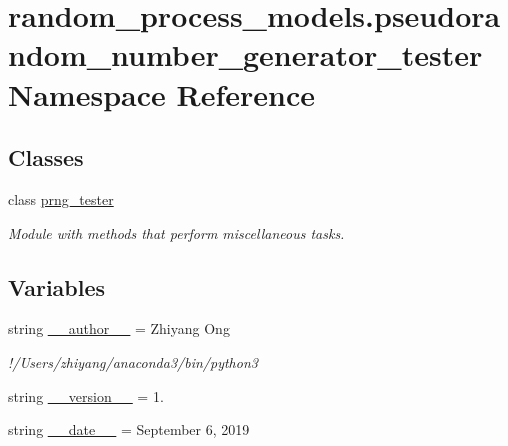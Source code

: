 \hypertarget{namespacerandom__process__models_1_1pseudorandom__number__generator__tester}{}\section{random\+\_\+process\+\_\+models.\+pseudorandom\+\_\+number\+\_\+generator\+\_\+tester Namespace Reference}
\label{namespacerandom__process__models_1_1pseudorandom__number__generator__tester}
\subsection*{Classes}
\begin{DoxyCompactItemize}
\item 
class \hyperlink{classrandom__process__models_1_1pseudorandom__number__generator__tester_1_1prng__tester}{prng\+\_\+tester}
\begin{DoxyCompactList}\small\item\em Module with methods that perform miscellaneous tasks. \end{DoxyCompactList}\end{DoxyCompactItemize}
\subsection*{Variables}
\begin{DoxyCompactItemize}
\item 
string \hyperlink{namespacerandom__process__models_1_1pseudorandom__number__generator__tester_a67279ea57e007a95e27af9f25cf84db6}{\+\_\+\+\_\+author\+\_\+\+\_\+} = \textquotesingle{}Zhiyang Ong\textquotesingle{}
\begin{DoxyCompactList}\small\item\em !/\+Users/zhiyang/anaconda3/bin/python3 \end{DoxyCompactList}\item 
string \hyperlink{namespacerandom__process__models_1_1pseudorandom__number__generator__tester_abdadf15e475ca77a4ef2bebd886b8dcc}{\+\_\+\+\_\+version\+\_\+\+\_\+} = \textquotesingle{}1.\textquotesingle{}
\item 
string \hyperlink{namespacerandom__process__models_1_1pseudorandom__number__generator__tester_a8dbe9b20b965a3a680bcad127e27c55e}{\+\_\+\+\_\+date\+\_\+\+\_\+} = \textquotesingle{}September 6, 2019\textquotesingle{}
\end{DoxyCompactItemize}


